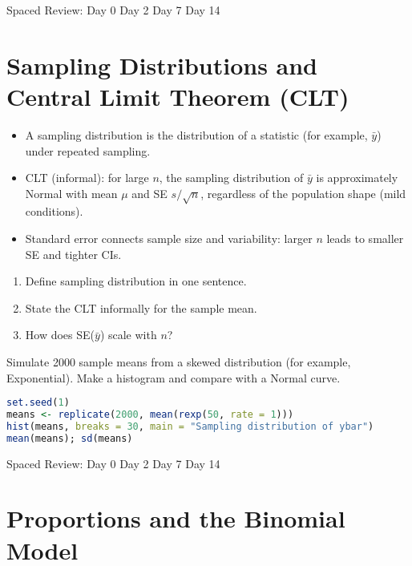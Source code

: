 \documentclass[11pt,a4paper]{article}
\def\textbf#1{#1}%
\newcommand{\reviewticks}{
  \vspace{0.4em}
  \noindent\scriptsize\textbf{Spaced Review:}
  \fbox{\phantom{D0}} Day 0\quad
  \fbox{\phantom{D2}} Day 2\quad
  \fbox{\phantom{D7}} Day 7\quad
  \fbox{\phantom{D14}} Day 14
}
\begin{document}
\reviewticks

\section{Sampling Distributions and Central Limit Theorem (CLT)}

\begin{corebox}
\begin{itemize}
  \item A sampling distribution is the distribution of a statistic (for example, \(\bar y\)) under repeated sampling.
  \item CLT (informal): for large \(n\), the sampling distribution of \(\bar y\) is approximately Normal with mean \(\mu\) and SE \(s/\sqrt{n}\), regardless of the population shape (mild conditions).
  \item Standard error connects sample size and variability: larger \(n\) leads to smaller SE and tighter CIs.
\end{itemize}
\end{corebox}

\begin{recallbox}
\begin{enumerate}
  \item Define sampling distribution in one sentence.
  \item State the CLT informally for the sample mean.
  \item How does SE(\(\bar y\)) scale with \(n\)?
\end{enumerate}
\end{recallbox}

\begin{practicebox}
Simulate 2000 sample means from a skewed distribution (for example, Exponential). Make a histogram and compare with a Normal curve.
\end{practicebox}

\begin{rbox}
\begin{lstlisting}[language=R]
set.seed(1)
means <- replicate(2000, mean(rexp(50, rate = 1)))
hist(means, breaks = 30, main = "Sampling distribution of ybar")
mean(means); sd(means)
\end{lstlisting}
\end{rbox}

\reviewticks

\section{Proportions and the Binomial Model}
\end{document}
